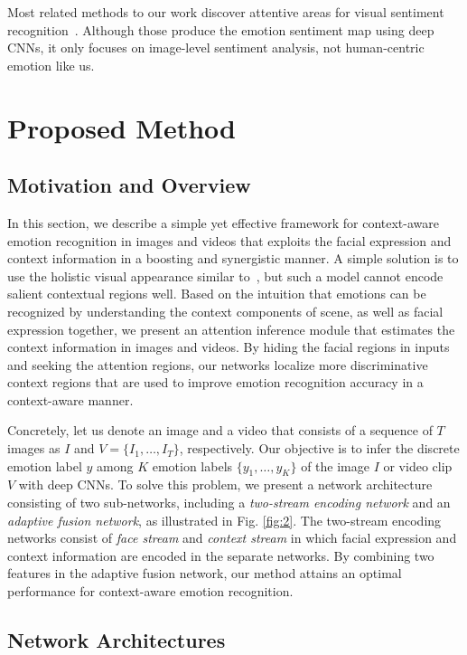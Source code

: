 \documentclass[10pt,twocolumn,letterpaper]{article}
\newcommand{\figref}[1]{Fig. \ref{#1}}
\begin{document}
Most related methods to our work discover attentive areas for visual sentiment recognition~\cite{yang2018weakly,you2017visual}.
Although those produce the emotion sentiment map using deep CNNs, it only focuses on image-level sentiment analysis, not human-centric emotion like us.

\section{Proposed Method}\label{sec:3}
\subsection{Motivation and Overview}\label{sec:31}
In this section, we describe a simple yet effective framework for context-aware emotion recognition in images and videos that exploits the facial expression and context information in a boosting and synergistic manner.
A simple solution is to use the holistic visual appearance similar to~\cite{kosti2017emotion,chen2016emotion}, but such a model cannot encode salient contextual regions well. Based on the intuition that emotions can be recognized by understanding the context components of scene, as well as facial expression together, we present an attention inference module that estimates the context information in images and videos. By hiding the facial regions in inputs and seeking the attention regions, our networks localize more discriminative context regions that are used to improve emotion recognition accuracy in a context-aware manner.

Concretely, let us denote an image and a video that consists of a sequence of $T$ images as $I$ and $V=\{I_1, \dots, I_T\}$, respectively.
Our objective is to infer the discrete emotion label $y$ among $K$ emotion labels $\{y_1,\dots, y_K\}$ of the image $I$ or video clip $V$ with deep CNNs. To solve this problem, we present a network architecture consisting of two sub-networks, including a \textit{two-stream encoding network} and an \textit{adaptive fusion network}, as illustrated in \figref{fig:2}. The two-stream encoding networks consist of \textit{face stream} and \textit{context stream} in which facial expression and context information are encoded in the separate networks. By combining two features in the adaptive fusion network, our method attains an optimal performance for context-aware emotion recognition.

\subsection{Network Architectures}\label{sec:32}
\end{document}
